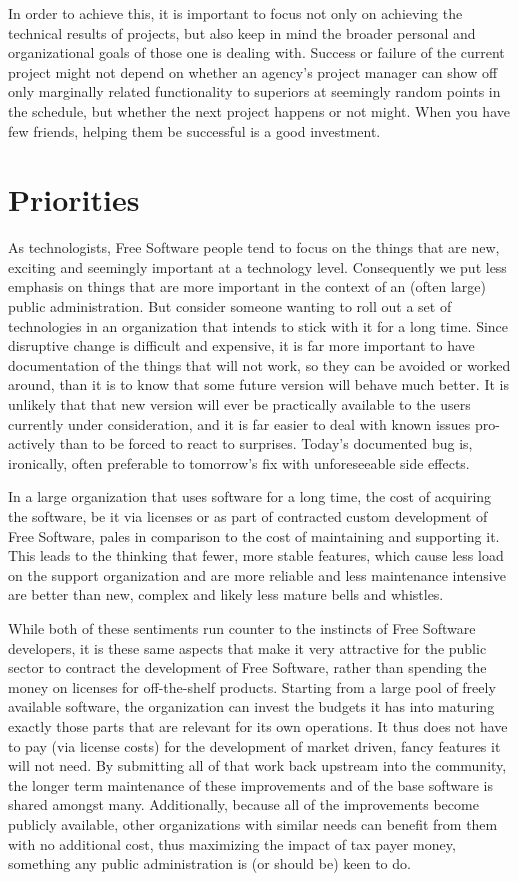 In order to achieve this, it is important to focus not only on achieving
the technical results of projects, but also keep in mind the broader personal and organizational
goals of those one is dealing with. Success or failure of the current
project might not depend on whether an agency's project manager can show off
only marginally related functionality to superiors at seemingly random points
in the schedule, but whether the next project happens or not might. When you have
few friends, helping them be successful is a good investment.

\section*{Priorities}

As technologists, Free Software people tend to focus on the things that are
new, exciting and seemingly important at a technology level. Consequently we
put less emphasis on things that are more important in the context of an (often
large) public administration. But consider someone wanting to roll out a
set of technologies in an organization that intends to stick with it for a long
time. Since disruptive change is difficult and expensive, it is far more
important to have documentation of the things that will not work, so they can
be avoided or worked around, than it is to know that some future version will
behave much better. It is unlikely that that new version will ever be
practically available to the users currently under consideration, and it is far
easier to deal with known issues pro-actively than to be forced to react to
surprises.  Today's documented bug is, ironically, often preferable to
tomorrow's fix with unforeseeable side effects.

In a large organization that uses software for a long time, the cost of acquiring
the software, be it via licenses or as part of contracted custom development of
Free Software, pales in comparison to the cost of maintaining and supporting it.
This leads to the thinking that fewer, more stable features, which cause less load
on the support organization and are more reliable and less maintenance intensive
are better than new, complex and likely less mature bells and whistles.

While both of these sentiments run counter to the instincts of Free Software
developers, it is these same aspects that make it very attractive for the
public sector to contract the development of Free Software, rather than
spending the money on licenses for off-the-shelf products. Starting from a
large pool of freely available software, the organization can invest the
budgets it has into maturing exactly those parts that are relevant for its own
operations. It thus does not have to pay (via license costs) for the development of
market driven, fancy features it will not need. By submitting all of that work
back upstream into the community, the longer term maintenance of these
improvements and of the base software is shared amongst many. Additionally,
because all of the improvements become publicly available, other
organizations with similar needs can benefit from them with no
additional cost, thus maximizing the impact of tax payer money,
something any public administration is (or should be) keen to do.

